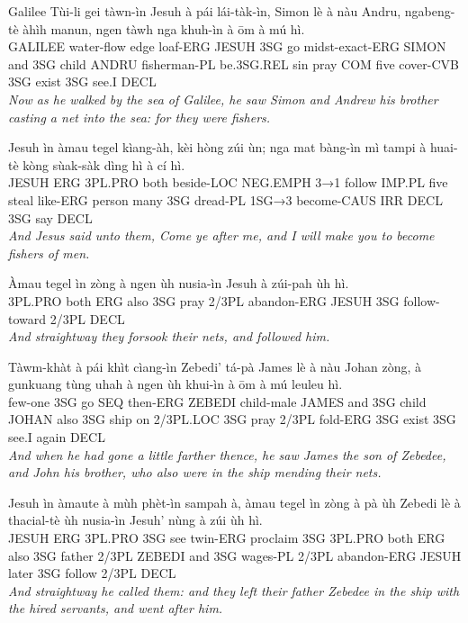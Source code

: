 \documentclass[11pt,a4paper]{article}
\begin{document}
\begin{exe}
\gll Galilee Tùi-li gei tàwn-ìn Jesuh à pái lái-tàk-ìn, Simon lè à nàu Andru, ngabeng-tè àhìh manun, ngen tàwh nga khuh-ìn à ōm à mú hì. \\
     GALILEE water-flow edge loaf-ERG JESUH 3SG go midst-exact-ERG SIMON and 3SG child ANDRU fisherman-PL be.3SG.REL sin pray COM five cover-CVB 3SG exist 3SG see.I DECL \\
\glt \textcolor{kjvcolor}{\textit{Now as he walked by the sea of Galilee, he saw Simon and Andrew his brother casting a net into the sea: for they were fishers.}}

\gll Jesuh ìn àmau tegel kìang-àh, kèi hòng zúi ùn; nga mat bàng-ìn mì tampi à huai-tè kòng sùak-sàk dìng hì à cí hì. \\
     JESUH ERG 3PL.PRO both beside-LOC NEG.EMPH 3→1 follow IMP.PL five steal like-ERG person many 3SG dread-PL 1SG→3 become-CAUS IRR DECL 3SG say DECL \\
\glt \textcolor{kjvcolor}{\textit{And Jesus said unto them, Come ye after me, and I will make you to become fishers of men.}}

\gll Àmau tegel ìn zòng à ngen ùh nusia-ìn Jesuh à zúi-pah ùh hì. \\
     3PL.PRO both ERG also 3SG pray 2/3PL abandon-ERG JESUH 3SG follow-toward 2/3PL DECL \\
\glt \textcolor{kjvcolor}{\textit{And straightway they forsook their nets, and followed him.}}

\gll Tàwm-khàt à pái khìt cìang-ìn Zebedi' tá-pà James lè à nàu Johan zòng, à gunkuang tùng uhah à ngen ùh khui-ìn à ōm à mú leuleu hì. \\
     few-one 3SG go SEQ then-ERG ZEBEDI child-male JAMES and 3SG child JOHAN also 3SG ship on 2/3PL.LOC 3SG pray 2/3PL fold-ERG 3SG exist 3SG see.I again DECL \\
\glt \textcolor{kjvcolor}{\textit{And when he had gone a little farther thence, he saw James the son of Zebedee, and John his brother, who also were in the ship mending their nets.}}

\gll Jesuh ìn àmaute à mùh phèt-ìn sampah à, àmau tegel ìn zòng à pà ùh Zebedi lè à thacial-tè ùh nusia-ìn Jesuh' nùng à zúi ùh hì. \\
     JESUH ERG 3PL.PRO 3SG see twin-ERG proclaim 3SG 3PL.PRO both ERG also 3SG father 2/3PL ZEBEDI and 3SG wages-PL 2/3PL abandon-ERG JESUH later 3SG follow 2/3PL DECL \\
\glt \textcolor{kjvcolor}{\textit{And straightway he called them: and they left their father Zebedee in the ship with the hired servants, and went after him.}}


\end{exe}
\end{document}
